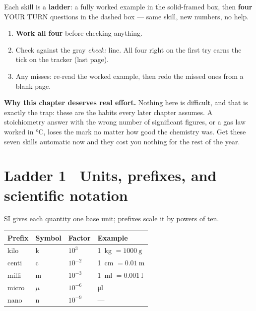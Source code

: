 \documentclass{apchem-worksheet}
\begin{document}
\apctitleblock

\begin{apcnote}
Each skill is a \textbf{ladder}: a fully worked example in the
solid-framed box, then \textbf{four} YOUR TURN questions in the dashed
box --- same skill, new numbers, no help.

\begin{enumerate}[leftmargin=*,itemsep=0.15em]
  \item \textbf{Work all four} before checking anything.
  \item Check against the gray \emph{check:} line. All four right on the
        first try earns the tick on the tracker (last page).
  \item Any misses: re-read the worked example, then redo the missed ones
        from a blank page.
\end{enumerate}

\textbf{Why this chapter deserves real effort.} Nothing here is
difficult, and that is exactly the trap: these are the habits every later
chapter assumes. A stoichiometry answer with the wrong number of
significant figures, or a gas law worked in \si{\celsius}, loses the mark
no matter how good the chemistry was. Get these seven skills automatic
now and they cost you nothing for the rest of the year.
\end{apcnote}

\section*{\sffamily Ladder 1 \textbullet\ Units, prefixes, and scientific
notation}

SI gives each quantity one base unit; prefixes scale it by powers of ten.

\begin{center}
\renewcommand{\arraystretch}{1.2}
\begin{tabular}{@{}llll@{}}
\hline
\textbf{Prefix} & \textbf{Symbol} & \textbf{Factor} &
  \textbf{Example} \\
\hline
kilo  & k & $10^{3}$    & \SI{1}{\kilo\gram} $= \SI{1000}{\gram}$ \\
centi & c & $10^{-2}$   & \SI{1}{\centi\meter} $= \SI{0.01}{\meter}$ \\
milli & m & $10^{-3}$   & \SI{1}{\milli\litre} $= \SI{0.001}{\litre}$ \\
micro & $\mu$ & $10^{-6}$ & \si{\micro\litre} \\
nano  & n & $10^{-9}$   & --- \\
\hline
\end{tabular}
\end{center}
\end{document}
